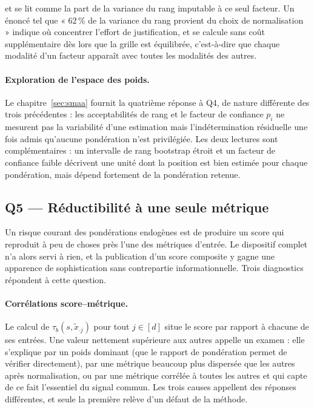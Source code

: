 \documentclass[11pt,a4paper]{article}
\theoremstyle{definition}
\theoremstyle{remark}
\begin{document}
\bigskip

et se lit comme la part de la variance du rang imputable à ce seul facteur. Un énoncé tel
que « $62\,\%$ de la variance du rang provient du choix de normalisation » indique où
concentrer l'effort de justification, et se calcule sans coût supplémentaire dès lors que
la grille est équilibrée, c'est-à-dire que chaque modalité d'un facteur apparaît avec
toutes les modalités des autres.

\bigskip

\paragraph{Exploration de l'espace des poids.} Le chapitre~\ref{sec:smaa} fournit la
quatrième réponse à Q4, de nature différente des trois précédentes : les acceptabilités de
rang et le facteur de confiance $p_i$ ne mesurent pas la variabilité d'une estimation mais
l'indétermination résiduelle une fois admis qu'aucune pondération n'est privilégiée. Les
deux lectures sont complémentaires : un intervalle de rang bootstrap étroit et un facteur de
confiance faible décrivent une unité dont la position est bien estimée pour chaque
pondération, mais dépend fortement de la pondération retenue.

\bigskip

\subsection{Q5 --- Réductibilité à une seule métrique}
\label{sec:q5}

\medskip

Un risque courant des pondérations endogènes est de produire un score qui reproduit à peu
de choses près l'une des métriques d'entrée. Le dispositif complet n'a alors servi à rien,
et la publication d'un score composite y gagne une apparence de sophistication sans
contrepartie informationnelle. Trois diagnostics répondent à cette question.

\bigskip

\paragraph{Corrélations score--métrique.} Le calcul de $\tau_b(s, \tilde{x}_{\cdot j})$
pour tout $j \in [d]$ situe le score par rapport à chacune de ses entrées. Une valeur
nettement supérieure aux autres appelle un examen : elle s'explique par un poids dominant
(que le rapport de pondération permet de vérifier directement), par une métrique beaucoup
plus dispersée que les autres après normalisation, ou par une métrique corrélée à toutes
les autres et qui capte de ce fait l'essentiel du signal commun. Les trois causes appellent
des réponses différentes, et seule la première relève d'un défaut de la méthode.
\end{document}
